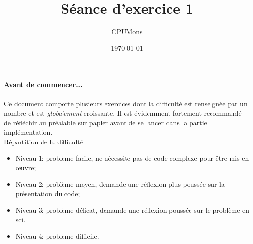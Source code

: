 \documentclass[a4paper]{article}
\title{Séance d'exercice 1}
\author{CPUMons}
\date{\today}
\begin{document}
\maketitle

\paragraph{Avant de commencer...}
Ce document comporte plusieurs exercices dont la difficulté est renseignée par un nombre et est \emph{globalement} croissante. Il est évidemment fortement recommandé de réfléchir au préalable sur papier avant de se lancer dans la partie implémentation.\\
Répartition de la difficulté:
\begin{itemize}
\item Niveau 1: problème facile, ne nécessite pas de code complexe pour être mis en œuvre;
\item Niveau 2: problème moyen, demande une réflexion plus poussée sur la présentation du code;
\item Niveau 3: problème délicat, demande une réflexion poussée sur le problème en soi.
\item Niveau 4: problème difficile.
\end{itemize}
\begin{comment}
\section{Rappel (ou non): lire une entrée}

\subsection{En théorie:}
En Python3, la fonction \emph{input()} est utilisée pour lire une entrée via l'invite de commande.\\
\emph{Entrée:} Aucun argument n'est obligatoire, mais on peut aussi fournir une chaîne de caractère qui sera affichée afin que l'utilisateur sache ce qu'il doit entrer.\\
\emph{Sortie:} L'entrée fournie par l'utilisateur, sous forme de chaine de caractère (\emph{String}).\\
Il est donc important de convertir la donnée retournée!
\subsection{En pratique:}
Tâche: additionner deux nombres donnés en entrée et afficher le résultat.\\
\begin{verbatim}
nbr1 = input("Votre premier nombre : ")
nbr2 = input("Votre second nombre : ")
res = int(nbr1) + int(nbr2)
print(res)
\end{verbatim}
\end{comment}
\end{document}
